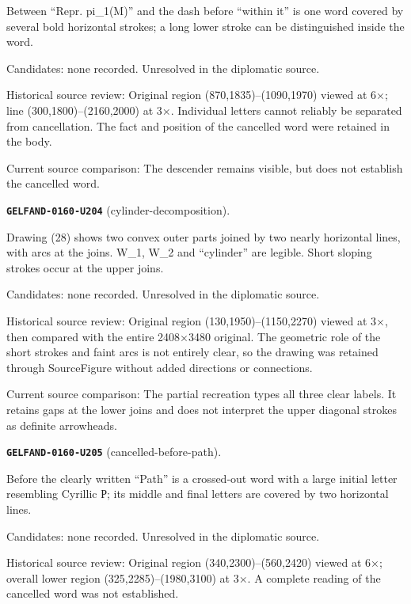 Between “Repr. pi\_1(M)” and the dash before “within it” is one word covered by several bold horizontal strokes; a long lower stroke can be distinguished inside the word.\par
Candidates: none recorded. Unresolved in the diplomatic source.\par
Historical source review: Original region (870,1835)–(1090,1970) viewed at 6×; line (300,1800)–(2160,2000) at 3×. Individual letters cannot reliably be separated from cancellation. The fact and position of the cancelled word were retained in the body.\par
Current source comparison: The descender remains visible, but does not establish the cancelled word.\par\medskip
\par\noindent\leavevmode{}\label{GELFAND-0160-U204}\label{GELFAND-P001477:cylinder-decomposition}\textbf{\texttt{GELFAND-0160-U204}} (cylinder-decomposition).\nopagebreak[4]\par
Drawing (28) shows two convex outer parts joined by two nearly horizontal lines, with arcs at the joins. W\_1, W\_2 and “cylinder” are legible. Short sloping strokes occur at the upper joins.\par
Candidates: none recorded. Unresolved in the diplomatic source.\par
Historical source review: Original region (130,1950)–(1150,2270) viewed at 3×, then compared with the entire 2408×3480 original. The geometric role of the short strokes and faint arcs is not entirely clear, so the drawing was retained through SourceFigure without added directions or connections.\par
Current source comparison: The partial recreation types all three clear labels. It retains gaps at the lower joins and does not interpret the upper diagonal strokes as definite arrowheads.\par\medskip
\par\noindent\leavevmode{}\label{GELFAND-0160-U205}\label{GELFAND-P001477:cancelled-before-path}\textbf{\texttt{GELFAND-0160-U205}} (cancelled-before-path).\nopagebreak[4]\par
Before the clearly written “Path” is a crossed-out word with a large initial letter resembling Cyrillic Р; its middle and final letters are covered by two horizontal lines.\par
Candidates: none recorded. Unresolved in the diplomatic source.\par
Historical source review: Original region (340,2300)–(560,2420) viewed at 6×; overall lower region (325,2285)–(1980,3100) at 3×. A complete reading of the cancelled word was not established.\par

